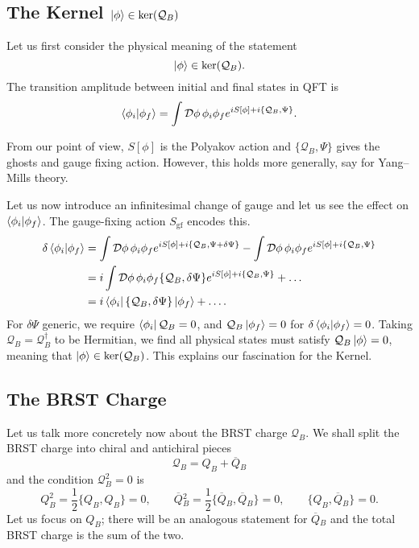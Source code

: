 \subsection*{The Kernel $\ket{\phi} \in \text{ker}(\mathcal{Q}_B)$}%

Let us first consider the physical meaning of the statement
\begin{equation}
  \ket{\phi} \in \text{ker}(\mathcal{Q}_B).
\end{equation}
The transition amplitude between initial and final states in QFT is
\begin{equation}
  \bra{\phi_i} \ket{\phi_f} = \int \mathop{\mathcal{D} \phi} \phi_i \phi_f e^{i S[\phi] + i \{\mathcal{Q}_B, \Psi\}}.
\end{equation}
\begin{remark}
  From our point of view, $S[\phi]$ is the Polyakov action and $\{\mathcal{Q}_B, \Psi\}$ gives the ghosts and gauge fixing action. However, this holds more generally, say for Yang--Mills theory.
\end{remark}
Let us now introduce an infinitesimal change of gauge and let us see the effect on $\bra{\phi_i} \ket{\phi_f}$.
The gauge-fixing action $S_{\text{gf}}$ encodes this.
\begin{align}
  \delta \bra{\phi_i} \ket{\phi_f} &= \int \mathop{\mathcal{D} \phi} \phi_i \phi_f e^{i S[\phi] + i \{\mathcal{Q}_B, \Psi + \delta \Psi\}} - \int \mathop{\mathcal{D} \phi} \phi_i \phi_f e^{i S[\phi] + i \{\mathcal{Q}_B, \Psi\}} \\
  &= i \int \mathop{\mathcal{D} \phi} \phi_i \phi_f \{\mathcal{Q}_B, \delta \Psi\} e^{i S[\phi] + i \{\mathcal{Q}_B, \Psi\}} + \dots \\
  &= i \bra{\phi_i} \{\mathcal{Q}_B, \delta \Psi\} \ket{\phi_f} + \dots.
\end{align}
For $\delta \Psi$ generic, we require $\bra{\phi_i} \mathcal{Q}_B = 0$, and $\mathcal{Q}_B \ket{\phi_f} = 0$ for $\delta \bra{\phi_i} \ket{\phi_f} = 0$.
Taking $\mathcal{Q}_B = \mathcal{Q}_B^{\dagger}$ to be Hermitian, we find all physical states must satisfy $\mathcal{Q}_B \ket{\phi} = 0$, meaning that $\ket{\phi} \in \text{ker}(\mathcal{Q}_B)$.
This explains our fascination for the Kernel.

\subsection{The BRST Charge}%
\label{sub:the_brst_charge}

Let us talk more concretely now about the BRST charge $\mathcal{Q}_B$.
We shall split the BRST charge into chiral and antichiral pieces
\begin{equation}
  \mathcal{Q}_B = Q_B + \overline{Q}{}_B
\end{equation}
and the condition $\mathcal{Q}_B^2 = 0$ is
\begin{equation}
  Q_B^2 = \frac{1}{2} \{Q_B, Q_B\} = 0, \qquad \overline{Q}{}_B^2 = \frac{1}{2} \{\overline{Q}{}_B, \overline{Q}{}_B\} = 0, \qquad \{Q_B, \overline{Q}{}_B\} = 0.
\end{equation}
Let us focus on $Q_B$; there will be an analogous statement for $\overline{Q}{}_B$ and the total BRST charge is the sum of the two.

